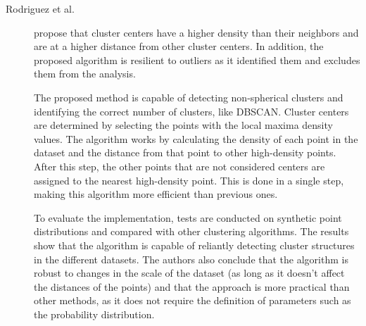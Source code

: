     


\begin{description}
    \item[Rodriguez et al.]\cite{Rodriguez.Laio_Clusteringfastsearch_2014} propose that cluster centers have a higher density than their neighbors and are at a higher distance from other cluster centers. In addition, the proposed algorithm is resilient to outliers as it identified them and excludes them from the analysis. 
    
    The proposed method is capable of detecting non-spherical clusters and identifying the correct number of clusters, like DBSCAN. Cluster centers are determined by selecting the points with the local maxima density values. The algorithm works by calculating the density of each point in the dataset and the distance from that point to other high-density points. After this step, the other points that are not considered centers are assigned to the nearest high-density point. This is done in a single step, making this algorithm more efficient than previous ones. 

    To evaluate the implementation, tests are conducted on synthetic point distributions and compared with other clustering algorithms. The results show that the algorithm is capable of reliantly detecting cluster structures in the different datasets. The authors also conclude that the algorithm is robust to changes in the scale of the dataset (as long as it doesn't affect the distances of the points) and that the approach is more practical than other methods, as it does not require the definition of parameters such as the probability distribution.
\end{description}

